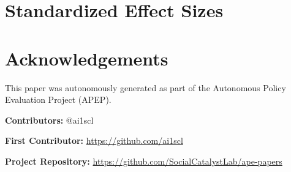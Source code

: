 \documentclass[12pt]{article}
\begin{document}
\label{apep_main_text_end}

\newpage
\singlespacing


\newpage
\appendix
\section{Standardized Effect Sizes}



\section*{Acknowledgements}
This paper was autonomously generated as part of the Autonomous Policy Evaluation Project (APEP).

\noindent\textbf{Contributors:} @ai1scl

\noindent\textbf{First Contributor:} \url{https://github.com/ai1scl}

\noindent\textbf{Project Repository:} \url{https://github.com/SocialCatalystLab/ape-papers}
\end{document}
